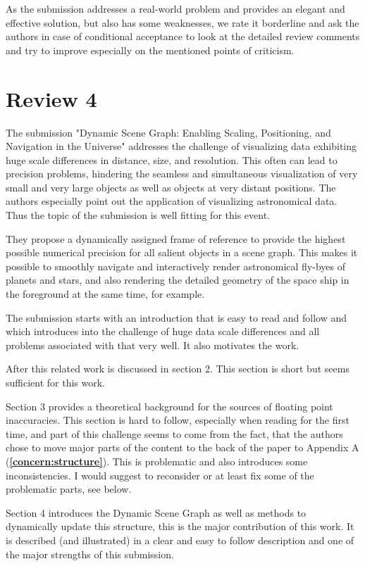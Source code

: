 \documentclass{article}
\let\oldref\ref
\renewcommand{\ref}[1]{(\textbf{\oldref{#1}})}
\begin{document}
As the submission addresses a real-world problem and provides an elegant and effective solution, but also has some weaknesses, we rate it borderline and ask the authors in case of conditional acceptance to look at the detailed review comments and try to improve especially on the mentioned points of criticism.

\section*{Review 4}

The submission "Dynamic Scene Graph: Enabling Scaling, Positioning, and Navigation in the Universe" addresses the challenge of visualizing data exhibiting huge scale differences in distance, size, and resolution.
This often can lead to precision problems, hindering the seamless and simultaneous visualization of very small and very large objects as well as objects at very distant positions.
The authors especially point out the application of visualizing astronomical data.
Thus the topic of the submission is well fitting for this event.

They propose a dynamically assigned frame of reference to provide the highest possible numerical precision for all salient objects in a scene graph. This makes it possible to smoothly navigate and interactively render astronomical fly-byes of planets and stars, and also rendering the detailed geometry of the space ship in the foreground at the same time, for example.

The submission starts with an introduction that is easy to read and follow and which introduces into the challenge of huge data scale differences and all problems associated with that very well. 
It also motivates the work.

After this related work is discussed in section 2.
This section is short but seems sufficient for this work.

Section 3 provides a theoretical background for the sources of floating point inaccuracies.
This section is hard to follow, especially when reading for the first time, and part of this challenge seems to come from the fact, that the authors chose to move major parts of the content to the back of the paper to Appendix A \ref{concern:structure}.
This is problematic and also introduces some inconsistencies.
I would suggest to reconsider or at least fix some of the problematic parts, see below.

Section 4 introduces the Dynamic Scene Graph as well as methods to dynamically update this structure, this is the major contribution of this work.
It is described (and illustrated) in a clear and easy to follow description and one of the major strengths of this submission.
\end{document}
